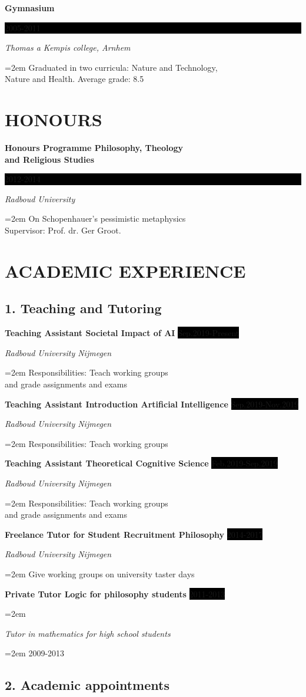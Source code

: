 \documentclass{article}
\newcommand{\sepspace}{\vspace*{1em}}		%
\newcommand{\NewPart}[1]{\section*{\uppercase{#1}}}
\newcommand{\EducationEntry}[4]{
		\noindent \textbf{#1} \hfill      %
		\colorbox{Black}{%
			\parbox{6em}{%
			\hfill\color{White}#2}} \par  %
		\noindent \textit{#3} \par        %
		\noindent\hangindent=2em\hangafter=0 \small #4 %
		\normalsize \par}
\newcommand{\WorkEntry}[4]{				  %
		\noindent \textbf{#1} \hfill      %
		\colorbox{Black}{\color{White}#2} \par  %
		\noindent \textit{#3} \par              %
		\noindent\hangindent=2em\hangafter=0 \small #4 %
		\normalsize \par}
\begin{document}
\sepspace

\EducationEntry{Gymnasium}{2005-2011}{Thomas a Kempis college, Arnhem}{Graduated in two curricula: Nature and Technology,\\ Nature and Health. Average grade: 8.5
}

\NewPart{Honours}{}

\EducationEntry{Honours Programme Philosophy, Theology\\ and Religious Studies}{2012-2014}{Radboud University}{On Schopenhauer's pessimistic metaphysics\\ Supervisor: Prof. dr. Ger Groot.
}

\sepspace

\NewPart{ACADEMIC EXPERIENCE}{}

\subsection*{1. Teaching and Tutoring}

\WorkEntry{Teaching Assistant Societal Impact of AI}{Sep.2019-Present}{Radboud University Nijmegen}{Responsibilities: Teach working groups\\ and grade assignments and exams }
\sepspace

\WorkEntry{Teaching Assistant Introduction Artificial Intelligence}{Sep.2019-Nov.2019}{Radboud University Nijmegen}{Responsibilities: Teach working groups }
\sepspace

\WorkEntry{Teaching Assistant Theoretical Cognitive Science}{Feb.2019-Sep.2019}{Radboud University Nijmegen}{Responsibilities: Teach working groups\\ and grade assignments and exams }
\sepspace

\WorkEntry{Freelance Tutor for Student Recruitment Philosophy}{2014-2017}{Radboud University Nijmegen}{Give working groups on university taster days}
\sepspace

\WorkEntry{Private Tutor Logic for philosophy students}{2011-2013}{}

\WorkEntry{Tutor in mathematics for high school students}{2009-2013}{}

\subsection*{2. Academic appointments}
\end{document}
